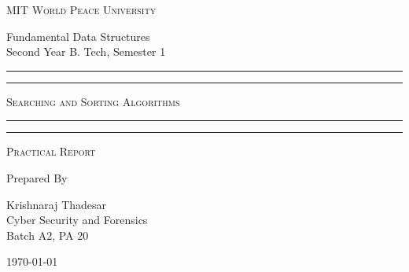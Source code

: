 \documentclass[11pt]{article}
\begin{document}
\begin{titlepage}
	\centering


	\huge\textsc{
		MIT World Peace University
	}\\

	\vspace{0.75\baselineskip} %

	\LARGE{
		Fundamental Data Structures\\
		Second Year B. Tech, Semester 1
	}

	\vfill %


	\rule{\textwidth}{1.6pt}\vspace*{-\baselineskip}\vspace*{2pt}
	\rule{\textwidth}{0.6pt}
	\vspace{0.75\baselineskip} %



	\huge{\textsc{
			Searching and Sorting Algorithms
		}} \\



	\vspace{0.5\baselineskip} %
	\rule{\textwidth}{0.6pt}\vspace*{-\baselineskip}\vspace*{2.8pt}
	\rule{\textwidth}{1.6pt}

	\vspace{1\baselineskip} %


	\LARGE\textsc{
		Practical Report
	} %
	\vfill


	Prepared By
	\vspace{0.5\baselineskip} %

	\Large{
		Krishnaraj Thadesar \\
		Cyber Security and Forensics\\
		Batch A2, PA 20
	}


	\vspace{0.5\baselineskip} %
	\today

\end{titlepage}
\end{document}
